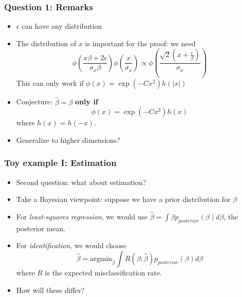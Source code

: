 \documentclass{beamer}
\newcommand{\argmin}{\text{argmin}}
\begin{document}
\begin{frame}
\frametitle{Question 1: Remarks}
\begin{itemize}
\item $\epsilon$ can have any distribution
\item The distribution of $x$ is important for the proof: we need
\[
\phi\left(\frac{x\beta + 2\epsilon}{\sigma_x \beta}\right)
\phi\left(\frac{x}{\sigma_x}\right) \propto 
\phi\left(\frac{\sqrt{2} (x + \frac{\epsilon}{\beta})}{\sigma_x}\right)
\]
This can only work if $\phi(x) = \exp(-C x^2)h(|x|)$
\item Conjecture: $\hat{\beta} = \beta$ \textbf{only if}
\[
\phi(x) = \exp(-C x^2) h(x)
\]
where $h(x) = h(-x)$.
\item Generalize to higher dimensions?
\end{itemize}
\end{frame}

\begin{frame}
\frametitle{Toy example I: Estimation}
\begin{itemize}
\item Second question: what about estimation?
\item Take a Bayesian viewpoint: suppose we have a prior distribution for $\beta$
\item For \emph{least-squares regression}, we would use $\hat{\beta} = \int \beta p_{posterior}(\beta) d\beta$, the posterior mean.
\item For \emph{identification}, we would choose
\[
\hat{\beta} = \argmin_{\hat{\beta}} \int R(\beta; \hat{\beta}) p_{posterior}(\beta) d\beta
\]
where $R$ is the expected misclassification rate.
\item How will these differ?
\end{itemize}
\end{frame}
\end{document}
